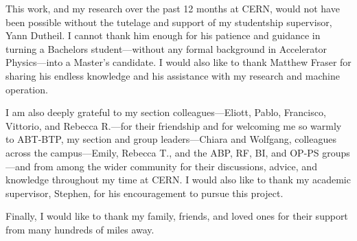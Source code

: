 This work, and my research over the past 12 months at CERN, would not have been possible without the tutelage and support of my studentship supervisor, Yann Dutheil. I cannot thank him enough for his patience and guidance in turning a Bachelors student---without any formal background in Accelerator Physics---into a Master's candidate. I would also like to thank Matthew Fraser for sharing his endless knowledge and his assistance with my research and machine operation. 

I am also deeply grateful to my section colleagues---Eliott, Pablo, Francisco, Vittorio, and Rebecca R.---for their friendship and for welcoming me so warmly to ABT-BTP, my section and group leaders---Chiara and Wolfgang, colleagues across the campus---Emily, Rebecca T., and the ABP, RF, BI, and OP-PS groups---and from among the wider community for their discussions, advice, and knowledge throughout my time at CERN. I would also like to thank my academic supervisor, Stephen, for his encouragement to pursue this project.

Finally, I would like to thank my family, friends, and loved ones for their support from many hundreds of miles away.